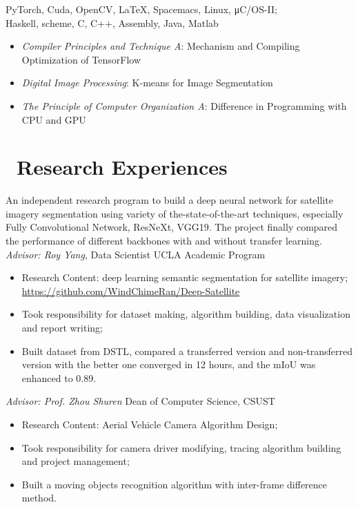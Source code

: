 \documentclass{resume}
\begin{document}
 PyTorch, Cuda, OpenCV, LaTeX, Spacemacs, Linux, μC/OS-II; \\
 Haskell, scheme, C, C++, Assembly, Java, Matlab
 
 \begin{itemize}
   \item \textit{Compiler Principles and Technique A}: Mechanism and Compiling
     Optimization of TensorFlow
   \item \textit{Digital Image Processing}: K-means for Image Segmentation
   \item \textit{The Principle of Computer Organization A}: Difference in Programming
     with CPU and GPU
 \end{itemize}
\section{\faLightbulbO\ Research Experiences}

An independent research program to build a deep neural network for satellite
imagery segmentation using variety of the-state-of-the-art techniques, especially Fully Convolutional Network, ResNeXt,
VGG19. The project finally compared the performance of different backbones with
and without transfer learning.
\\ 
\textit{Advisor: Roy Yang}, Data Scientist \hfill{UCLA Academic Program}
\begin{itemize}
 \item Research Content: deep learning semantic segmentation for satellite
   imagery; \\
   {\url{https://github.com/WindChimeRan/Deep-Satellite}}
 \item Took responsibility for dataset making, algorithm building, data
visualization and report writing;
  \item Built dataset from DSTL, compared a transferred version and
    non-transferred version with the better one converged in 12 hours, and the
    mIoU was enhanced to 0.89.

\end{itemize}



\textit{Advisor: Prof. Zhou Shuren} \hfill{Dean of Computer Science, CSUST}
\begin{itemize}
 \item Research Content: Aerial Vehicle Camera Algorithm Design;
 \item Took responsibility for camera driver modifying, tracing algorithm building and
project management;
 \item Built a moving objects recognition algorithm with inter-frame difference method.


\end{itemize}
\end{document}
